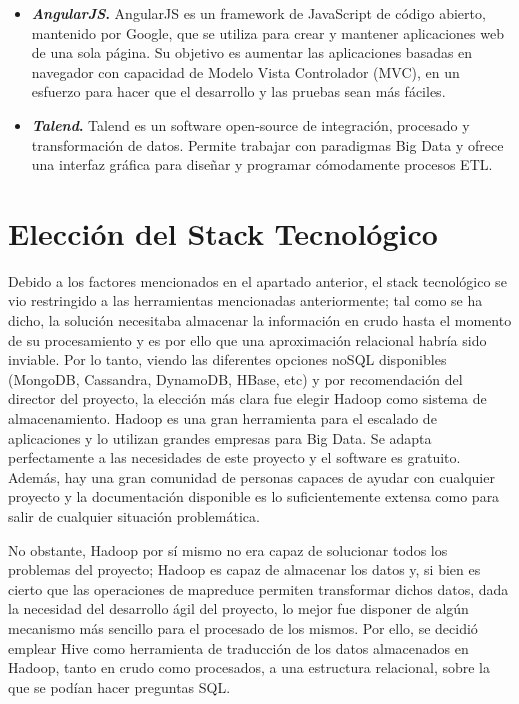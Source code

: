 \begin{itemize}
\item \textbf{\textit{AngularJS}.} \cite{angularjs} AngularJS es un framework de JavaScript de código abierto, mantenido por Google, que se utiliza para crear y mantener aplicaciones web de una sola página. Su objetivo es aumentar las aplicaciones basadas en navegador con capacidad de Modelo Vista Controlador (MVC), en un esfuerzo para hacer que el desarrollo y las pruebas sean más fáciles.
\item \textbf{\textit{Talend}.} \cite{talend} Talend es un software open-source de integración, procesado y transformación de datos. Permite trabajar con paradigmas Big Data y ofrece una interfaz gráfica para diseñar y programar cómodamente procesos ETL. 
\end{itemize}

\section{Elección del Stack Tecnológico}
Debido a los factores mencionados en el apartado anterior, el stack tecnológico se vio restringido a las herramientas mencionadas anteriormente; tal como se ha dicho, la solución necesitaba almacenar la información en crudo hasta el momento de su procesamiento y es por ello que una aproximación relacional habría sido inviable. Por lo tanto, viendo las diferentes opciones noSQL disponibles (MongoDB, Cassandra, DynamoDB, HBase, etc) y por recomendación del director del proyecto, la elección más clara fue elegir Hadoop como sistema de almacenamiento. Hadoop es una gran herramienta para el escalado de aplicaciones y lo utilizan grandes empresas para Big Data. Se adapta perfectamente a las necesidades de este proyecto y el software es gratuito. Además, hay una gran comunidad de personas capaces de ayudar con cualquier proyecto y la documentación disponible es lo suficientemente extensa como para salir de cualquier situación problemática. \par
No obstante, Hadoop por sí mismo no era capaz de solucionar todos los problemas del proyecto; Hadoop es capaz de almacenar los datos y, si bien es cierto que las operaciones de mapreduce permiten transformar dichos datos, dada la necesidad del desarrollo ágil del proyecto, lo mejor fue disponer de algún mecanismo más sencillo para el procesado de los mismos. Por ello, se decidió emplear Hive como herramienta de traducción de los datos almacenados en Hadoop, tanto en crudo como procesados, a una estructura relacional, sobre la que se podían hacer preguntas SQL. \par
